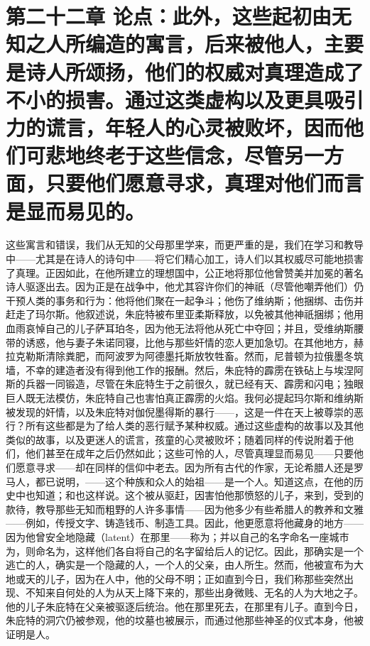 
\section{第二十二章 论点：此外，这些起初由无知之人所编造的寓言，后来被他人，主要是诗人所颂扬，他们的权威对真理造成了不小的损害。通过这类虚构以及更具吸引力的谎言，年轻人的心灵被败坏，因而他们可悲地终老于这些信念，尽管另一方面，只要他们愿意寻求，真理对他们而言是显而易见的。}

这些寓言和错误，我们从无知的父母那里学来，而更严重的是，我们在学习和教导中——尤其是在诗人的诗句中——将它们精心加工，诗人们以其权威尽可能地损害了真理。正因如此，在他所建立的理想国中，公正地将那位他曾赞美并加冕的著名诗人驱逐出去。因为正是在战争中，他尤其容许你们的神祇（尽管他嘲弄他们）仍干预人类的事务和行为：他将他们聚在一起争斗；他伤了维纳斯；他捆绑、击伤并赶走了玛尔斯。他叙述说，朱庇特被布里亚柔斯释放，以免被其他神祇捆绑；他用血雨哀悼自己的儿子萨耳珀冬，因为他无法将他从死亡中夺回；并且，受维纳斯腰带的诱惑，他与妻子朱诺同寝，比他与那些奸情的恋人更加急切。在其他地方，赫拉克勒斯清除粪肥，而阿波罗为阿德墨托斯放牧牲畜。然而，尼普顿为拉俄墨冬筑墙，不幸的建造者没有得到他工作的报酬。然后，朱庇特的霹雳在铁砧上与埃涅阿斯的兵器一同锻造，尽管在朱庇特生于之前很久，就已经有天、霹雳和闪电；独眼巨人既无法模仿，朱庇特自己也害怕真正霹雳的火焰。我何必提起玛尔斯和维纳斯被发现的奸情，以及朱庇特对伽倪墨得斯的暴行——，这是一件在天上被尊崇的恶行？所有这些都是为了给人类的恶行赋予某种权威。通过这些虚构的故事以及其他类似的故事，以及更迷人的谎言，孩童的心灵被败坏；随着同样的传说附着于他们，他们甚至在成年之后仍然如此；这些可怜的人，尽管真理显而易见——只要他们愿意寻求——却在同样的信仰中老去。因为所有古代的作家，无论希腊人还是罗马人，都已说明，——这个种族和众人的始祖——是一个人。知道这点，在他的历史中也知道；和也这样说。这个被从驱赶，因害怕他那愤怒的儿子，来到，受到的款待，教导那些无知而粗野的人许多事情——因为他多少有些希腊人的教养和文雅——例如，传授文字、铸造钱币、制造工具。因此，他更愿意将他藏身的地方——因为他曾安全地隐藏（latent）在那里——称为；并以自己的名字命名一座城市为，则命名为，这样他们各自将自己的名字留给后人的记忆。因此，那确实是一个逃亡的人，确实是一个隐藏的人，一个人的父亲，由人所生。然而，他被宣布为大地或天的儿子，因为在人中，他的父母不明；正如直到今日，我们称那些突然出现、不知来自何处的人为从天上降下来的，那些出身微贱、无名的人为大地之子。他的儿子朱庇特在父亲被驱逐后统治。他在那里死去，在那里有儿子。直到今日，朱庇特的洞穴仍被参观，他的坟墓也被展示，而通过他那些神圣的仪式本身，他被证明是人。\par

